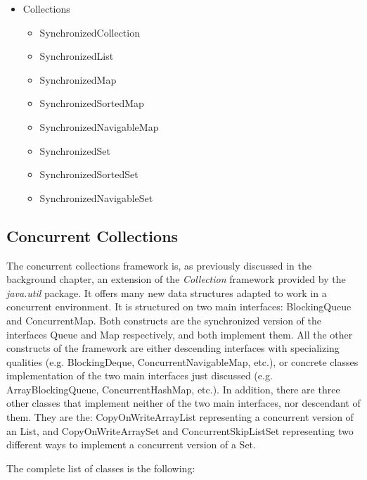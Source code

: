 \documentclass[]{usiinfthesis}
\begin{document}
\begin{itemize}
    \item Collections
    \begin{itemize}
        \item SynchronizedCollection 
        \item SynchronizedList 
        \item SynchronizedMap 
        \item SynchronizedSortedMap
        \item SynchronizedNavigableMap
        \item SynchronizedSet
        \item SynchronizedSortedSet
        \item SynchronizedNavigableSet
    \end{itemize}
\end{itemize}


\subsection{Concurrent Collections}
The concurrent collections framework is, as previously discussed in the background chapter, an extension of the \textit{Collection} framework provided by the \textit{java.util} package. It offers many new data structures adapted to work in a concurrent environment. It is structured on two main interfaces: BlockingQueue and ConcurrentMap. Both constructs are the synchronized version of the interfaces Queue and Map respectively, and both implement them. All the other constructs of the framework are either descending interfaces with specializing qualities (e.g. BlockingDeque, ConcurrentNavigableMap, etc.), or concrete classes implementation of the two main interfaces just discussed (e.g. ArrayBlockingQueue, ConcurrentHashMap, etc.).  In addition, there are three other classes that implement neither of the two main interfaces, nor descendant of them. They are the: CopyOnWriteArrayList representing a concurrent version of an List, and CopyOnWriteArraySet and ConcurrentSkipListSet representing two different ways to implement a concurrent version of a Set. 

The complete list of classes is the following:
\end{document}
